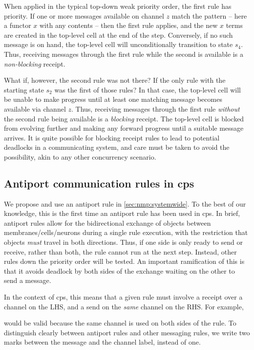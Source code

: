 When applied in the typical top-down weak priority order, the first rule has priority.  If one or more messages available on channel \(z\) match the pattern -- here a functor \(x\) with any contents -- then the first rule applies, and the new \(x\) terms are created in the top-level cell at the end of the step.  Conversely, if no such message is on hand, the top-level cell will unconditionally transition to state \(s_4\).  Thus, receiving messages through the first rule while the second is available is a \emph{non-blocking} receipt.

What if, however, the second rule was not there? If the only rule with the starting state \(s_2\) was the first of those rules?  In that case, the top-level cell will be unable to make progress until at least one matching message becomes available via channel \(z\).  Thus, receiving messages through the first rule \emph{without} the second rule being available is a \emph{blocking} receipt.  The top-level cell is blocked from evolving further and making any forward progress until a suitable message arrives.  It is quite possible for blocking receipt rules to lead to potential deadlocks in a communicating system, and care must be taken to avoid the possibility, akin to any other concurrency scenario.

\subsection{\label{sec:nmp:antiport}Antiport communication rules in \texorpdfstring{\gls{cps}}{cP systems}}

We propose and use an antiport rule \cite{Orellana-Martin2019,Paun2002} in \autoref{sec:nmp:systemwide}.  To the best of our knowledge, this is the first time an antiport rule has been used in \gls{cps}.  In brief, antiport rules allow for the bidirectional exchange of objects between membranes/cells/neurons during a single rule execution, with the restriction that objects \emph{must} travel in both directions.  Thus, if one side is only ready to send or receive, rather than both, the rule cannot run at the next step.  Instead, other rules down the priority order will be tested.  An important ramification of this is that it avoids deadlock by both sides of the exchange waiting on the other to send a message.

In the context of \gls{cps}, this means that a given rule must involve a receipt over a channel on the LHS, and a send on the \emph{same} channel on the RHS.  For example,
\begin{framed}
\vspace{-1.0cm}
\vspace{-0.7cm}
\end{framed}\noindent
would be valid because the same channel is used on both sides of the rule.  To distinguish clearly between antiport rules and other messaging rules, we write two marks between the message and the channel label, instead of one.
